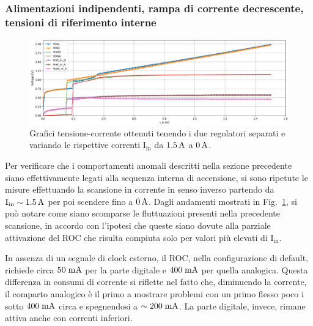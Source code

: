

\subsubsection{Alimentazioni indipendenti, rampa di corrente decrescente, tensioni di riferimento interne}

\begin{figure}[t]
\centering
\includegraphics[width=\textwidth]{Immagini/IDI2}
\caption{Grafici tensione-corrente ottenuti tenendo i due regolatori separati e variando le rispettive correnti $\mathrm{I_{in}}$ da $1.5\rm \, A$ a $0\rm \, A$.}
\label{IDI}
\end{figure}

Per verificare che i comportamenti anomali descritti nella sezione precedente siano effettivamente legati alla sequenza interna di accensione, si sono ripetute le misure effettuando la scansione in corrente in senso inverso partendo da $\mathrm{I_{in}}\sim1.5\rm \, A$ per poi scendere fino a $0\rm \, A$. Dagli andamenti mostrati in Fig.~\ref{IDI}, si può notare come siano scomparse le fluttuazioni presenti nella precedente scansione, in accordo con l'ipotesi che queste siano dovute alla parziale attivazione del ROC che risulta compiuta solo per valori pi\`u elevati di $\mathrm{I_{in}}$. 

In assenza di un segnale di clock esterno, il ROC, nella configurazione di default, richiede circa $50\rm \; mA$ per la parte digitale e $400\rm \; mA$ per quella analogica.
Questa differenza in consumi di corrente si riflette nel fatto che, diminuendo la corrente, il comparto analogico \`e il primo a mostrare problemi con un primo flesso poco i sotto $400\rm \; mA$ circa e spegnendosi a $\sim 200\rm \; mA$. La parte digitale, invece, rimane attiva anche con correnti inferiori.

